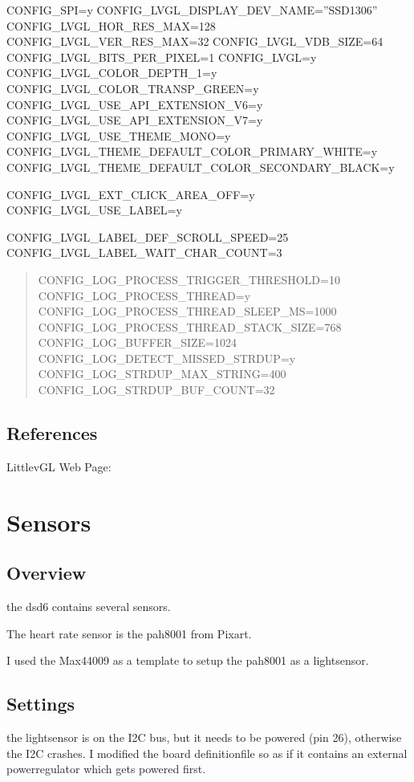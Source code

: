 \documentclass[letterpaper,10pt,english]{sphinxmanual}
\begin{document}
CONFIG\_SPI=y
CONFIG\_LVGL\_DISPLAY\_DEV\_NAME=”SSD1306”
CONFIG\_LVGL\_HOR\_RES\_MAX=128
CONFIG\_LVGL\_VER\_RES\_MAX=32
CONFIG\_LVGL\_VDB\_SIZE=64
CONFIG\_LVGL\_BITS\_PER\_PIXEL=1
CONFIG\_LVGL=y
CONFIG\_LVGL\_COLOR\_DEPTH\_1=y
CONFIG\_LVGL\_COLOR\_TRANSP\_GREEN=y
CONFIG\_LVGL\_USE\_API\_EXTENSION\_V6=y
CONFIG\_LVGL\_USE\_API\_EXTENSION\_V7=y
CONFIG\_LVGL\_USE\_THEME\_MONO=y
CONFIG\_LVGL\_THEME\_DEFAULT\_COLOR\_PRIMARY\_WHITE=y
CONFIG\_LVGL\_THEME\_DEFAULT\_COLOR\_SECONDARY\_BLACK=y

CONFIG\_LVGL\_EXT\_CLICK\_AREA\_OFF=y
CONFIG\_LVGL\_USE\_LABEL=y

CONFIG\_LVGL\_LABEL\_DEF\_SCROLL\_SPEED=25
CONFIG\_LVGL\_LABEL\_WAIT\_CHAR\_COUNT=3
\begin{quote}

CONFIG\_LOG\_PROCESS\_TRIGGER\_THRESHOLD=10
CONFIG\_LOG\_PROCESS\_THREAD=y
CONFIG\_LOG\_PROCESS\_THREAD\_SLEEP\_MS=1000
CONFIG\_LOG\_PROCESS\_THREAD\_STACK\_SIZE=768
CONFIG\_LOG\_BUFFER\_SIZE=1024
CONFIG\_LOG\_DETECT\_MISSED\_STRDUP=y
CONFIG\_LOG\_STRDUP\_MAX\_STRING=400
CONFIG\_LOG\_STRDUP\_BUF\_COUNT=32
\end{quote}


\section{References}
\label{\detokenize{lvgl:references}}

LittlevGL Web Page: 


\chapter{Sensors}
\label{\detokenize{sensor:sensors}}\label{\detokenize{sensor::doc}}

\section{Overview}
\label{\detokenize{sensor:overview}}
the dsd6 contains several sensors.

The heart rate sensor is the pah8001 from Pixart.

I used the Max44009 as a template to setup the pah8001 as a lightsensor.


\section{Settings}
\label{\detokenize{sensor:settings}}
the lightsensor is on the I2C bus, but it needs to be powered (pin 26), otherwise the I2C crashes. I modified the board definitionfile so as if it contains an external powerregulator which gets powered first.
\end{document}
